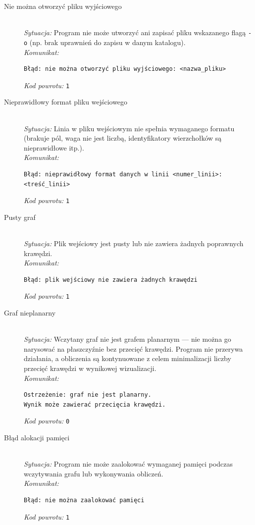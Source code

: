 \documentclass[12pt]{article}
\begin{document}
\begin{description}
	\item[Nie można otworzyć pliku wyjściowego]
	      \hfill \\
	      \textit{Sytuacja:} Program nie może utworzyć ani zapisać pliku wskazanego
	      flagą \texttt{-o} (np. brak uprawnień do zapisu w danym katalogu). \\
	      \textit{Komunikat:}
	      \begin{verbatim}
Błąd: nie można otworzyć pliku wyjściowego: <nazwa_pliku>
    \end{verbatim}
	      \textit{Kod powrotu:} \texttt{1}

	\item[Nieprawidłowy format pliku wejściowego]
	      \hfill \\
	      \textit{Sytuacja:} Linia w pliku wejściowym nie spełnia wymaganego formatu
	      (brakuje pól, waga nie jest liczbą, identyfikatory wierzchołków są
	      nieprawidłowe itp.). \\
	      \textit{Komunikat:}
	      \begin{verbatim}
Błąd: nieprawidłowy format danych w linii <numer_linii>: <treść_linii>
    \end{verbatim}
	      \textit{Kod powrotu:} \texttt{1}

	\item[Pusty graf]
	      \hfill \\
	      \textit{Sytuacja:} Plik wejściowy jest pusty lub nie zawiera żadnych
	      poprawnych krawędzi. \\
	      \textit{Komunikat:}
	      \begin{verbatim}
Błąd: plik wejściowy nie zawiera żadnych krawędzi
    \end{verbatim}
	      \textit{Kod powrotu:} \texttt{1}

	\item[Graf nieplanarny]
	      \hfill \\
	      \textit{Sytuacja:} Wczytany graf nie jest grafem planarnym — nie można go
	      narysować na płaszczyźnie bez przecięć krawędzi. Program nie przerywa
	      działania, a obliczenia są kontynuowane z celem minimalizacji liczby
	      przecięć krawędzi w wynikowej wizualizacji. \\
	      \textit{Komunikat:}
	      \begin{verbatim}
Ostrzeżenie: graf nie jest planarny. 
Wynik może zawierać przecięcia krawędzi.
    \end{verbatim}
	      \textit{Kod powrotu:} \texttt{0}

    \item[Błąd alokacji pamięci]
	      \hfill \\
	      \textit{Sytuacja:} Program nie może zaalokować wymaganej pamięci podczas
	      wczytywania grafu lub wykonywania obliczeń. \\
	      \textit{Komunikat:}
	      \begin{verbatim}
Błąd: nie można zaalokować pamięci
    \end{verbatim}
	      \textit{Kod powrotu:} \texttt{1}

\end{description}
\end{document}
